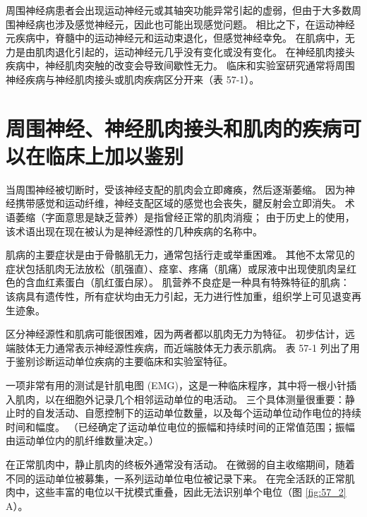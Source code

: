 周围神经病患者会出现运动神经元或其轴突功能异常引起的虚弱，但由于大多数周围神经病也涉及感觉神经元，因此也可能出现感觉问题。
相比之下，在运动神经元疾病中，脊髓中的运动神经元和运动束退化，但感觉神经幸免。
在肌病中，无力是由肌肉退化引起的，运动神经元几乎没有变化或没有变化。
在神经肌肉接头疾病中，神经肌肉突触的改变会导致间歇性无力。
临床和实验室研究通常将周围神经疾病与神经肌肉接头或肌肉疾病区分开来（表 57-1）。



\section{周围神经、神经肌肉接头和肌肉的疾病可以在临床上加以鉴别}

当周围神经被切断时，受该神经支配的肌肉会立即瘫痪，然后逐渐萎缩。
因为神经携带感觉和运动纤维，神经支配区域的感觉也会丧失，腱反射会立即消失。
术语萎缩（字面意思是缺乏营养）是指曾经正常的肌肉消瘦；
由于历史上的使用，该术语出现在现在被认为是神经源性的几种疾病的名称中。


肌病的主要症状是由于骨骼肌无力，通常包括行走或举重困难。
其他不太常见的症状包括肌肉无法放松（肌强直）、痉挛、疼痛（肌痛）或尿液中出现使肌肉呈红色的含血红素蛋白（肌红蛋白尿）。
肌营养不良症是一种具有特殊特征的肌病：
该病具有遗传性，所有症状均由无力引起，无力进行性加重，组织学上可见退变再生迹象。


区分神经源性和肌病可能很困难，因为两者都以肌肉无力为特征。
初步估计，远端肢体无力通常表示神经源性疾病，而近端肢体无力表示肌病。
表 57-1 列出了用于鉴别诊断运动单位疾病的主要临床和实验室特征。


一项非常有用的测试是针肌电图 (EMG)，这是一种临床程序，其中将一根小针插入肌肉，以在细胞外记录几个相邻运动单位的电活动。
三个具体测量很重要：静止时的自发活动、自愿控制下的运动单位数量，以及每个运动单位动作电位的持续时间和幅度。
（已经确定了运动单位电位的振幅和持续时间的正常值范围；振幅由运动单位内的肌纤维数量决定。）


在正常肌肉中，静止肌肉的终板外通常没有活动。
在微弱的自主收缩期间，随着不同的运动单位被募集，一系列运动单位电位被记录下来。
在完全活跃的正常肌肉中，这些丰富的电位以干扰模式重叠，因此无法识别单个电位（图 \ref{fig:57_2} A）。


